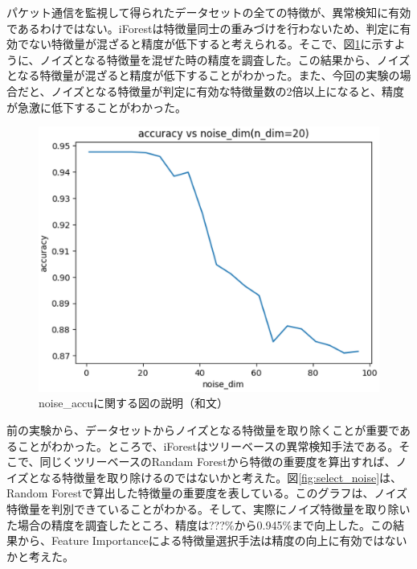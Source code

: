 \documentclass{css}
\begin{document}
パケット通信を監視して得られたデータセットの全ての特徴が、異常検知に有効であるわけではない。iForestは特徴量同士の重みづけを行わないため、判定に有効でない特徴量が混ざると精度が低下すると考えられる。そこで、図\ref{fig:noise_accu}に示すように、ノイズとなる特徴量を混ぜた時の精度を調査した。この結果から、ノイズとなる特徴量が混ざると精度が低下することがわかった。また、今回の実験の場合だと、ノイズとなる特徴量が判定に有効な特徴量数の2倍以上になると、精度が急激に低下することがわかった。

\begin{figure}[tb]
    \centering
    \includegraphics[width=\linewidth]{pictures/eps/noise_accu.eps}
    \caption{noise\_accuに関する図の説明（和文）}
    \label{fig:noise_accu}
\end{figure}

前の実験から、データセットからノイズとなる特徴量を取り除くことが重要であることがわかった。ところで、iForestはツリーベースの異常検知手法である。そこで、同じくツリーベースのRandam Forestから特徴の重要度を算出すれば、ノイズとなる特徴量を取り除けるのではないかと考えた。図\ref{fig:select_noise}は、Random Forestで算出した特徴量の重要度を表している。このグラフは、ノイズ特徴量を判別できていることがわかる。そして、実際にノイズ特徴量を取り除いた場合の精度を調査したところ、精度は???\%から0.945\%まで向上した。この結果から、Feature Importanceによる特徴量選択手法は精度の向上に有効ではないかと考えた。
\end{document}
